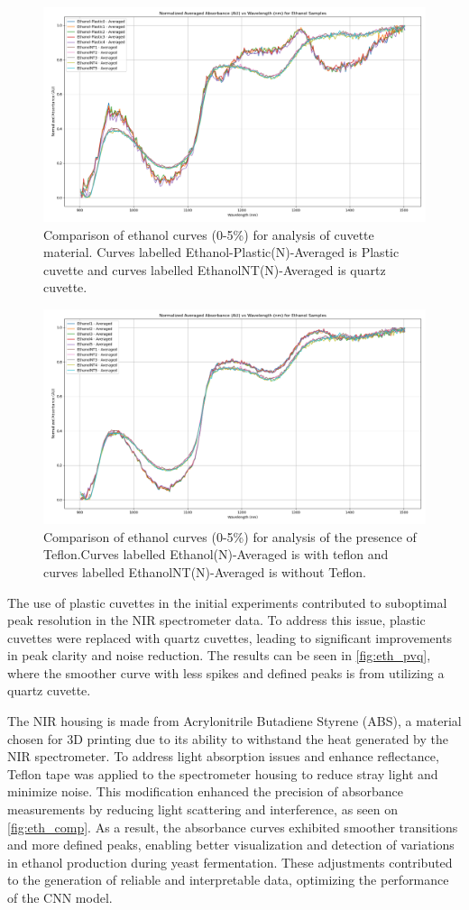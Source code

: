 \documentclass[12pt]{report}
\begin{document}
\begin{figure}[!h]
    \centering
    \includegraphics[width=0.75\linewidth]{Images/Ethanol_Standard_PvQ.png}
    \caption{Comparison of ethanol curves (0-5\%) for analysis of cuvette
    material. Curves labelled Ethanol-Plastic(N)-Averaged is Plastic cuvette and
    curves labelled EthanolNT(N)-Averaged is quartz cuvette.}
    \label{fig:eth_pvq}
\end{figure}

\begin{figure}[!h]
    \centering
    \includegraphics[width=0.75\linewidth]{Images/Ethanol_Standard_Compared.png}
    \caption{Comparison of ethanol curves (0-5\%) for analysis of the
    presence of Teflon.Curves labelled Ethanol(N)-Averaged is with teflon and
    curves labelled EthanolNT(N)-Averaged is without Teflon.}
    \label{fig:eth_comp}
\end{figure}

The use of plastic cuvettes in the initial experiments contributed to suboptimal peak resolution in the NIR spectrometer data. To address this issue, plastic cuvettes were replaced with quartz cuvettes, leading to significant improvements in peak clarity and noise reduction. The results can be seen in \autoref{fig:eth_pvq}, where the smoother curve with less spikes and defined peaks is from utilizing a quartz cuvette. 

The NIR housing is made from Acrylonitrile Butadiene Styrene (ABS), a material chosen for 3D printing due to its ability to withstand the heat generated by the NIR spectrometer. To address light absorption issues and enhance reflectance, Teflon tape was applied to the spectrometer housing to reduce stray light and minimize noise. This modification enhanced the precision of absorbance measurements by reducing light scattering and interference, as seen on \autoref{fig:eth_comp}. As a result, the absorbance curves exhibited smoother transitions and more defined peaks, enabling better visualization and detection of variations in ethanol production during yeast fermentation. These adjustments contributed to the generation of reliable and interpretable data, optimizing the performance of the CNN model.
\end{document}
